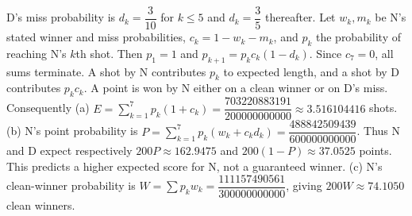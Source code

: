 D's miss probability is $d_k=\dfrac{3}{10}$ for $k\le5$ and $d_k=\dfrac{3}{5}$ thereafter. Let $w_k,m_k$ be N's stated winner and miss probabilities, $c_k=1-w_k-m_k$, and $p_k$ the probability of reaching N's $k$th shot. Then $p_1=1$ and $p_{k+1}=p_kc_k(1-d_k)$. Since $c_7=0$, all sums terminate. A shot by N contributes $p_k$ to expected length, and a shot by D contributes $p_kc_k$. A point is won by N either on a clean winner or on D's miss. Consequently (a) $E=\sum_{k=1}^7p_k(1+c_k)=\boxed{\dfrac{703220883191}{200000000000}}\approx3.516104416$ shots. (b) N's point probability is $P=\sum_{k=1}^7p_k(w_k+c_kd_k)=\dfrac{488842509439}{600000000000}$. Thus N and D expect respectively $\boxed{200P\approx162.9475}$ and $\boxed{200(1-P)\approx37.0525}$ points. This predicts a higher expected score for N, not a guaranteed winner. (c) N's clean-winner probability is $W=\sum p_kw_k=\dfrac{111157490561}{300000000000}$, giving $\boxed{200W\approx74.1050}$ clean winners.
